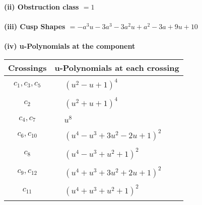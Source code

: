 \documentclass[1p]{elsarticle_modified}
\theoremstyle{definition}
\begin{document}
\flushleft \textbf{(ii) Obstruction class $= 1$}\\~\\
\flushleft \textbf{(iii) Cusp Shapes $= - a^3 u-3 a^3-3 a^2 u+a^2-3 a+9 u+10$}\\~\\
\newpage\renewcommand{\arraystretch}{1}
\flushleft \textbf{(iv) u-Polynomials at the component}\newline \\
\begin{tabular}{m{50pt}|m{274pt}}
Crossings & \hspace{64pt}u-Polynomials at each crossing \\
\hline $$\begin{aligned}c_{1},c_{3},c_{5}\end{aligned}$$&$\begin{aligned}
&(u^2- u+1)^4
\end{aligned}$\\
\hline $$\begin{aligned}c_{2}\end{aligned}$$&$\begin{aligned}
&(u^2+u+1)^4
\end{aligned}$\\
\hline $$\begin{aligned}c_{4},c_{7}\end{aligned}$$&$\begin{aligned}
&u^8
\end{aligned}$\\
\hline $$\begin{aligned}c_{6},c_{10}\end{aligned}$$&$\begin{aligned}
&(u^4- u^3+3 u^2-2 u+1)^2
\end{aligned}$\\
\hline $$\begin{aligned}c_{8}\end{aligned}$$&$\begin{aligned}
&(u^4- u^3+u^2+1)^2
\end{aligned}$\\
\hline $$\begin{aligned}c_{9},c_{12}\end{aligned}$$&$\begin{aligned}
&(u^4+u^3+3 u^2+2 u+1)^2
\end{aligned}$\\
\hline $$\begin{aligned}c_{11}\end{aligned}$$&$\begin{aligned}
&(u^4+u^3+u^2+1)^2
\end{aligned}$\\
\hline
\end{tabular}\\~\\
\end{document}
